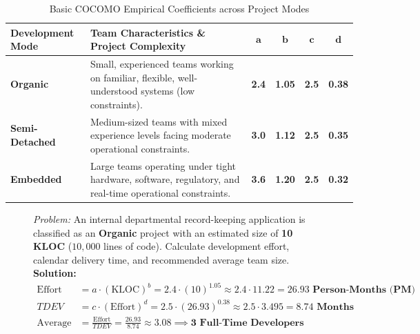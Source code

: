 \begin{table}[htbp]
\centering
\small
\caption{Basic COCOMO Empirical Coefficients across Project Modes}
\label{tab:cocomo_coefficients}
\begin{tabularx}{\textwidth}{l X c c c c}
\toprule
\textbf{Development Mode} & \textbf{Team Characteristics \& Project Complexity} & $\mathbf{a}$ & $\mathbf{b}$ & $\mathbf{c}$ & $\mathbf{d}$ \\
\midrule
\textbf{Organic} & Small, experienced teams working on familiar, flexible, well-understood systems (low constraints). & \textbf{2.4} & \textbf{1.05} & \textbf{2.5} & \textbf{0.38} \\
\textbf{Semi-Detached} & Medium-sized teams with mixed experience levels facing moderate operational constraints. & \textbf{3.0} & \textbf{1.12} & \textbf{2.5} & \textbf{0.35} \\
\textbf{Embedded} & Large teams operating under tight hardware, software, regulatory, and real-time operational constraints. & \textbf{3.6} & \textbf{1.20} & \textbf{2.5} & \textbf{0.32} \\
\bottomrule
\end{tabularx}
\end{table}

\begin{figure}[htbp]
\centering
\begin{tcolorbox}[colback=codebg, colframe=primary, title=\textbf{Worked Example: Basic COCOMO Effort and Duration}]
\textit{Problem:} An internal departmental record-keeping application is classified as an \textbf{Organic} project with an estimated size of \textbf{10 KLOC} ($10,000$ lines of code). Calculate development effort, calendar delivery time, and recommended average team size. \\
\textbf{Solution:}
\begin{align*}
\text{Effort} &= a \cdot (\text{KLOC})^b = 2.4 \cdot (10)^{1.05} \approx 2.4 \cdot 11.22 = \mathbf{26.93\text{ Person-Months (PM)}} \\
TDEV &= c \cdot (\text{Effort})^d = 2.5 \cdot (26.93)^{0.38} \approx 2.5 \cdot 3.495 = \mathbf{8.74\text{ Months}} \\
\text{Average Staffing} &= \frac{\text{Effort}}{TDEV} = \frac{26.93}{8.74} \approx \mathbf{3.08 \implies 3\text{ Full-Time Developers}}
\end{align*}
\end{tcolorbox}
\end{figure}

